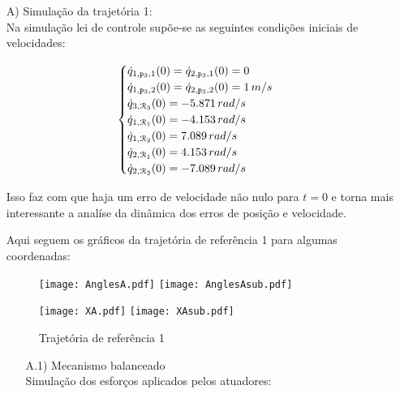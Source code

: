 \begin{itemize}
\item[A)] Simula\c{c}\~ao da trajet\'oria 1: \\

Na simula\c{c}\~ao lei de controle sup\~oe-se as seguintes condi\c{c}\~oes iniciais de velocidades:

$$\begin{cases}
\dot{q}_{1,\mathtt{p}_3,1}(0) = \dot{q}_{2,\mathtt{p}_3,1}(0) = 0 \\
\dot{q}_{1,\mathtt{p}_3,2}(0) = \dot{q}_{2,\mathtt{p}_3,2}(0) = 1 \,m/s \\
\dot{q}_{3, \mathcal{R}_3}(0) = -5.871 \, rad/s \\
\dot{q}_{1,\mathcal{R}_1}(0) = -4.153 \, rad/s \\
\dot{q}_{1,\mathcal{R}_2}(0) = 7.089 \, rad/s \\
\dot{q}_{2,\mathcal{R}_1}(0) = 4.153 \, rad/s \\
\dot{q}_{2,\mathcal{R}_2}(0) = -7.089 \, rad/s \\
\end{cases}$$

Isso faz com que haja um erro de velocidade n\~ao nulo para $t=0$ e torna mais interessante a anal\'ise da din\^amica dos erros de posi\c{c}\~ao e velocidade.

Aqui seguem os gr\'aficos da trajet\'oria de refer\^encia 1 para algumas coordenadas:

\begin{figure}[H]
\centering
\begin{minipage}[b]{0.45\linewidth}
\texttt{[image: AnglesA.pdf]}
\texttt{[image: AnglesAsub.pdf]}
\label{fig:AnglesA}
\end{minipage}
\quad
\begin{minipage}[b]{0.45\linewidth}
\texttt{[image: XA.pdf]}
\texttt{[image: XAsub.pdf]}
\label{fig:XA}
\end{minipage}
\caption{Trajet\'oria de refer\^encia 1}
\end{figure}

\begin{itemize}
\item[A.1)] Mecanismo balanceado \\

Simula\c{c}\~ao dos esfor\c{c}os aplicados pelos atuadores:


\end{itemize}
\end{itemize}
